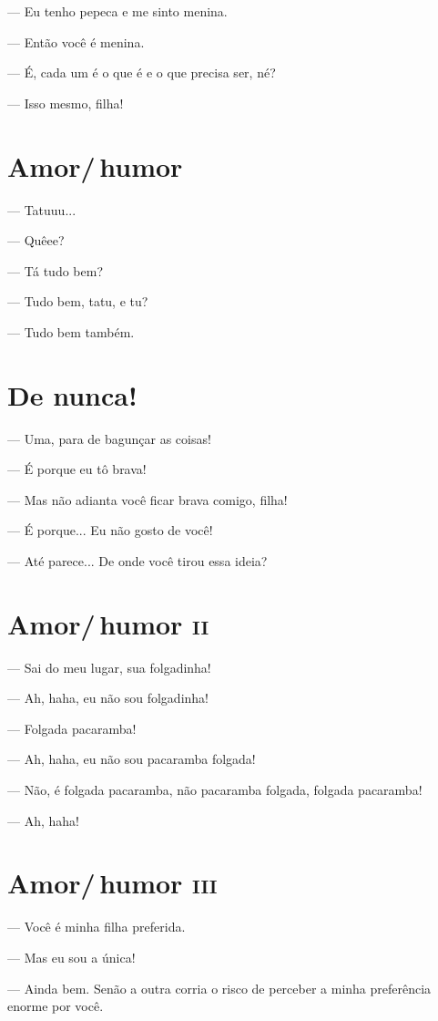 — Eu tenho pepeca e me sinto menina.

— Então você é menina.

— É, cada um é o que é e o que precisa ser, né?

— Isso mesmo, filha!

\chapter{Amor/\,humor}

— Tatuuu...

— Quêee?

— Tá tudo bem?

— Tudo bem, tatu, e tu?

— Tudo bem também.

\chapter{De nunca!}

— Uma, para de bagunçar as coisas!

— É porque eu tô brava!

— Mas não adianta você ficar brava comigo, filha!

— É porque... Eu não gosto de você!

— Até parece... De onde você tirou essa ideia?

\chapter{Amor/\,humor \textsc{ii}}

— Sai do meu lugar, sua folgadinha!

— Ah, haha, eu não sou folgadinha!

— Folgada pacaramba!

— Ah, haha, eu não sou pacaramba folgada!

— Não, é folgada pacaramba, não pacaramba folgada, folgada pacaramba!

— Ah, haha!

\chapter{Amor/\,humor \textsc{iii}}

— Você é minha filha preferida.

— Mas eu sou a única!

— Ainda bem. Senão a outra corria o risco de perceber a minha
preferência enorme por você.

